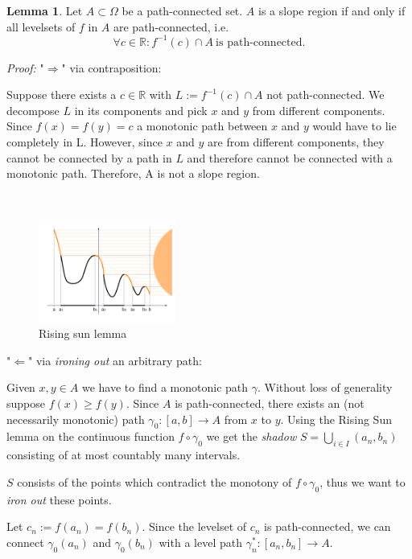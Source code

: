 \documentclass[a4paper,12pt]{paper}
\theoremstyle{plain}
\theoremstyle{definition}
\newtheorem{lem}[thm]{Lemma}
\begin{document}
\begin{lem}
Let $A \subset \Omega$ be a path-connected set. $A$ is a slope region if and only if all levelsets of $f$ in $A$ are path-connected, i.e.
\begin{equation*}
\forall c \in \mathbb{R}: f^{-1}(c) \cap A ~ \text{is path-connected}.
\end{equation*}
\end{lem}

\emph{Proof:} "$\Rightarrow$" via contraposition:

Suppose there exists a $c \in \mathbb{R}$ with $L := f^{-1}(c) \cap A$ not path-connected. We decompose $L$ in its components and pick $x$ and $y$ from different components. Since $f(x) = f(y) = c$ a monotonic path between $x$ and $y$ would have to lie completely in L. However, since $x$ and $y$ are from different components, they cannot be connected by a path in $L$ and therefore cannot be connected with a monotonic path. Therefore, A is not a slope region.

$~$

\begin{figure}
\centering
\includegraphics[width=0.4\textwidth]{img/Rising_sun_lemma.png}
\caption{Rising sun lemma}
\label{fig:lemma_1}
\end{figure}

"$\Leftarrow$" via \emph{ironing out} an arbitrary path:

Given $x, y \in A$ we have to find a monotonic path $\gamma$. Without loss of generality suppose $f(x) \geq f(y)$. Since $A$ is path-connected, there exists an (not necessarily monotonic) path $\gamma_0: [a,b] \to A$ from $x$ to $y$. Using the Rising Sun lemma \cite{grill} on the continuous function $f \circ \gamma_0$ we get the \emph{shadow} $S = \bigcup_{i \in I} (a_n, b_n)$ consisting of at most countably many intervals.

$S$ consists of the points which contradict the monotony of $f \circ \gamma_0$, thus we want to \emph{iron out} these points.

Let $c_n := f(a_n) = f(b_n)$. Since the levelset of $c_n$ is path-connected, we can connect $\gamma_0(a_n)$ and $\gamma_0(b_n)$ with a level path $\gamma_n^* : [a_n, b_n] \to A.$
\end{document}
